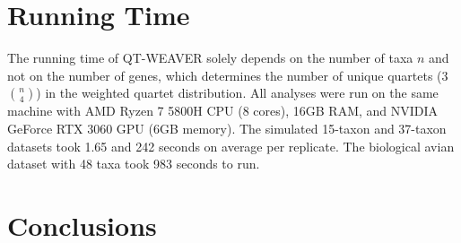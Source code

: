 \documentclass[10pt,a4paper]{article}
\begin{document}
\vspace{-10pt}
\section{Running Time}
The running time of QT-WEAVER solely depends on the number of taxa $n$ and not on the number of genes, which determines the number of unique quartets ($3$$n \choose 4$) in the weighted quartet distribution.
All analyses were run on the same machine with AMD Ryzen 7 5800H CPU (8 cores), 16GB RAM, and NVIDIA GeForce RTX 3060 GPU (6GB memory). The simulated 15-taxon and 37-taxon datasets took 1.65 and 242 seconds on average per replicate. The biological avian dataset with 48 taxa took 983 seconds to run.


        

\vspace{-10pt}
\section{Conclusions}
\end{document}
